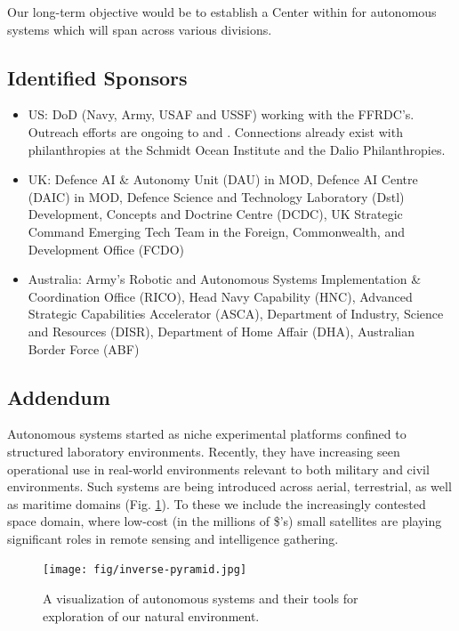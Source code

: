 \documentclass[11pt,letterpaper]{article}
\begin{document}
Our long-term objective would be to establish a Center within \org for
autonomous systems which will span across various divisions.

\subsection{Identified Sponsors}

\begin{itemize}

\item US: DoD (Navy, Army, USAF and USSF) working with the \org
  FFRDC's. Outreach efforts are ongoing to \onr and \noae. Connections
  already exist with philanthropies at the Schmidt Ocean Institute and
  the Dalio Philanthropies. 

\item UK: Defence AI \& Autonomy Unit (DAU) in MOD, Defence AI Centre
  (DAIC) in MOD, Defence Science and Technology Laboratory (Dstl)
  Development, Concepts and Doctrine Centre (DCDC), UK Strategic
  Command Emerging Tech Team in the Foreign, Commonwealth, and
  Development Office (FCDO)

\item Australia: Army's Robotic and Autonomous Systems Implementation
  \& Coordination Office (RICO), Head Navy Capability (HNC), Advanced
  Strategic Capabilities Accelerator (ASCA), Department of Industry,
  Science and Resources (DISR), Department of Home Affair (DHA),
  Australian Border Force (ABF)

\end{itemize}

\pagebreak

\subsection{Addendum}

Autonomous systems started as niche experimental platforms confined to
structured laboratory environments. Recently, they have increasing
seen operational use in real-world environments relevant to both
military and civil environments. Such systems are being introduced
across aerial, terrestrial, as well as maritime domains
(Fig. \ref{fig:inverse}). To these we include the increasingly
contested space domain, where low-cost (in the millions of \$'s) small
satellites are playing significant roles in remote sensing and
intelligence gathering.

\begin{figure}  
  \centering 
  \texttt{[image: fig/inverse-pyramid.jpg]} 
  \caption{A visualization of autonomous systems and their tools for
    exploration of our natural environment.}
  \label{fig:inverse}
\end{figure}
\end{document}
